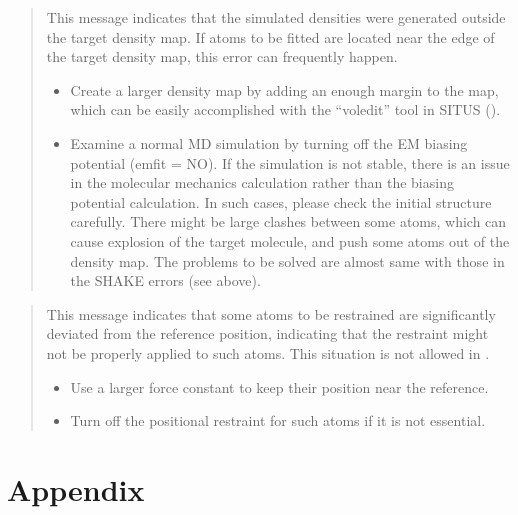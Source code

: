 \documentclass[a4paper,11pt,oneside,english]{sphinxmanual}
\begin{document}
\begin{quote}

This message indicates that the simulated densities were generated outside the target density map.
If atoms to be fitted are located near the edge of the target density map, this error can frequently happen.
\begin{itemize}
\item {} 
Create a larger density map by adding an enough margin to the map,
which can be easily accomplished with the “voledit” tool in SITUS ().

\item {} 
Examine a normal MD simulation by turning off the EM biasing potential (emfit = NO).
If the simulation is not stable, there is an issue in the molecular mechanics calculation
rather than the biasing potential calculation.
In such cases, please check the initial structure carefully.
There might be large clashes between some atoms, which can cause explosion of
the target molecule, and push some atoms out of the density map.
The problems to be solved are almost same with those in the SHAKE errors (see above).

\end{itemize}
\end{quote}

\begin{quote}

This message indicates that some atoms to be restrained are significantly deviated
from the reference position, indicating that the restraint might not be properly applied to such atoms.
This situation is not allowed in .
\begin{itemize}
\item {} 
Use a larger force constant to keep their position near the reference.

\item {} 
Turn off the positional restraint for such atoms if it is not essential.

\end{itemize}
\end{quote}


\chapter{Appendix}
\label{\detokenize{98_Appendix:appendix}}\label{\detokenize{98_Appendix:id1}}\label{\detokenize{98_Appendix::doc}}
\end{document}
